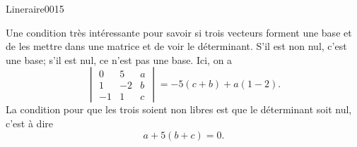 \begin{corrige}{Lineraire0015}

	Une condition très intéressante pour savoir si trois vecteurs forment une base et de les
    mettre dans une matrice et de voir le déterminant. S'il est non nul, c'est une base;
    s'il est nul, ce n'est pas une base. Ici, on a
	\begin{equation}
		\begin{vmatrix}
			0	&	5	&	a	\\
			1	&	-2	&	b	\\
			-1	&	1	&	c
		\end{vmatrix}=
		-5(c+b)+a(1-2).
	\end{equation}
	La condition pour que les trois soient non libres est que le déterminant soit nul, c'est à dire
	\begin{equation}
		a+5(b+c)=0.
	\end{equation}
	

\end{corrige}

